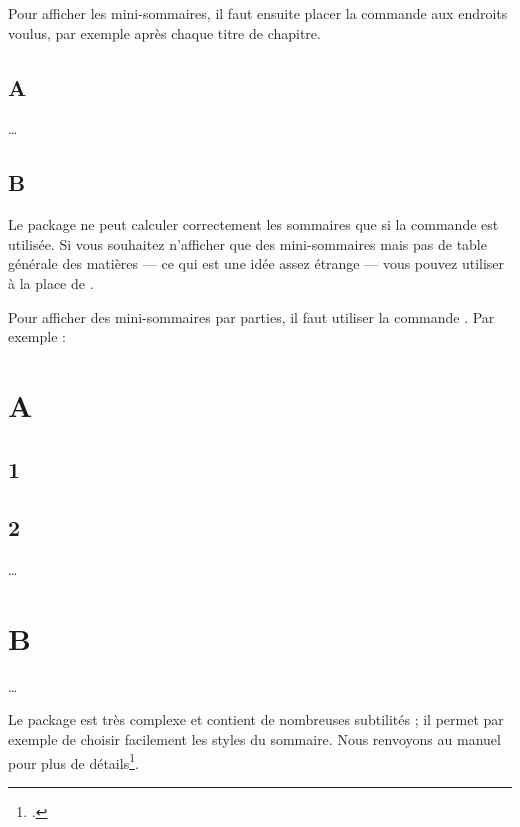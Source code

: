 \begin{latexcode}
\usepackage[french]{minitoc}
\dominitoc
\end{latexcode}

Pour afficher les mini-sommaires, il faut ensuite placer la commande  aux endroits voulus, par exemple après chaque titre de chapitre.

\begin{latexcode}
\chapter{A}
\minitoc
…
\chapter{B}
\minitoc
\end{latexcode}

\begin{attention}
Le package ne peut calculer correctement les sommaires que si la commande  est utilisée. Si vous souhaitez n'afficher que des mini-sommaires mais pas de table générale des matières --- ce qui est une idée assez étrange --- vous pouvez utiliser  à la place de .
\end{attention}

Pour afficher des mini-sommaires par parties, il faut utiliser la commande . Par exemple :

\begin{latexcode}
\part{A}
\parttoc
\chapter{1}
\chapter{2}
…
\part{B}
\parttoc
…
\end{latexcode}


Le package  est très complexe et contient de nombreuses subtilités ; il permet  par exemple de choisir facilement les styles du sommaire. Nous renvoyons au manuel pour plus de détails\footcite[Notamment][]{minitoc_typesetting}.

